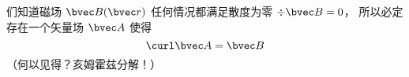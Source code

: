 
\begin{issues}
\issueDraft
\end{issues}

们知道磁场 $\bvec B(\bvec r)$ 任何情况都满足散度为零 $\div \bvec B = 0$， 所以必定存在一个矢量场 $\bvec A$ 使得
\begin{equation}
\curl \bvec A = \bvec B
\end{equation}
（何以见得？亥姆霍兹分解！）
